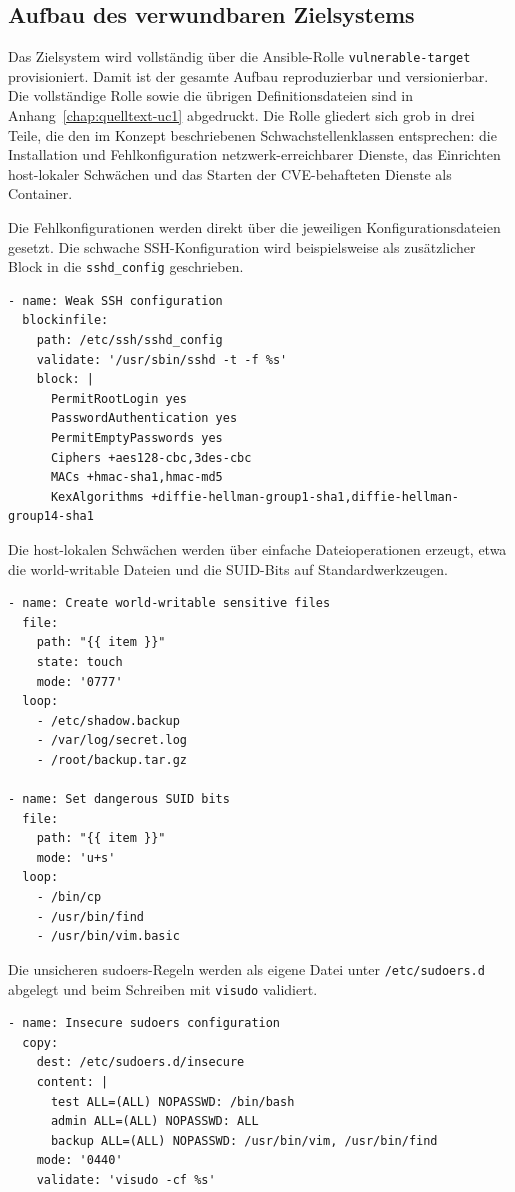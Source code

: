 \subsection{Aufbau des verwundbaren Zielsystems}
\label{subsec:uc1-zielsystem-aufbau}

Das Zielsystem wird vollständig über die Ansible-Rolle \texttt{vulnerable-target} provisioniert.
Damit ist der gesamte Aufbau reproduzierbar und versionierbar. Die vollständige Rolle sowie die
übrigen Definitionsdateien sind in Anhang~\ref{chap:quelltext-uc1} abgedruckt. Die Rolle gliedert
sich grob in drei
Teile, die den im Konzept beschriebenen Schwachstellenklassen entsprechen: die Installation und
Fehlkonfiguration netzwerk-erreichbarer Dienste, das Einrichten host-lokaler Schwächen und das
Starten der CVE-behafteten Dienste als Container.

Die Fehlkonfigurationen werden direkt über die jeweiligen Konfigurationsdateien gesetzt. Die
schwache SSH-Konfiguration wird beispielsweise als zusätzlicher Block in die \texttt{sshd\_config}
geschrieben.

\begin{verbatim}
- name: Weak SSH configuration
  blockinfile:
    path: /etc/ssh/sshd_config
    validate: '/usr/sbin/sshd -t -f %s'
    block: |
      PermitRootLogin yes
      PasswordAuthentication yes
      PermitEmptyPasswords yes
      Ciphers +aes128-cbc,3des-cbc
      MACs +hmac-sha1,hmac-md5
      KexAlgorithms +diffie-hellman-group1-sha1,diffie-hellman-group14-sha1
\end{verbatim}

Die host-lokalen Schwächen werden über einfache Dateioperationen erzeugt, etwa die world-writable
Dateien und die SUID-Bits auf Standardwerkzeugen.

\begin{verbatim}
- name: Create world-writable sensitive files
  file:
    path: "{{ item }}"
    state: touch
    mode: '0777'
  loop:
    - /etc/shadow.backup
    - /var/log/secret.log
    - /root/backup.tar.gz

- name: Set dangerous SUID bits
  file:
    path: "{{ item }}"
    mode: 'u+s'
  loop:
    - /bin/cp
    - /usr/bin/find
    - /usr/bin/vim.basic
\end{verbatim}

Die unsicheren sudoers-Regeln werden als eigene Datei unter \texttt{/etc/sudoers.d} abgelegt und beim
Schreiben mit \texttt{visudo} validiert.

\begin{verbatim}
- name: Insecure sudoers configuration
  copy:
    dest: /etc/sudoers.d/insecure
    content: |
      test ALL=(ALL) NOPASSWD: /bin/bash
      admin ALL=(ALL) NOPASSWD: ALL
      backup ALL=(ALL) NOPASSWD: /usr/bin/vim, /usr/bin/find
    mode: '0440'
    validate: 'visudo -cf %s'
\end{verbatim}

